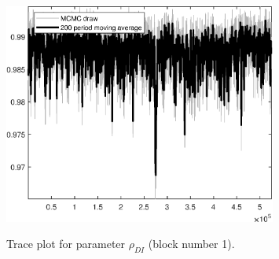 \begin{figure}[H]
\centering
  \includegraphics[width=0.8\textwidth]{BRS_growth_KPR/graphs/TracePlot_rho_DI_blck_1}\\
    \caption{Trace plot for parameter ${\rho_{DI}}$ (block number 1).}
\end{figure}
